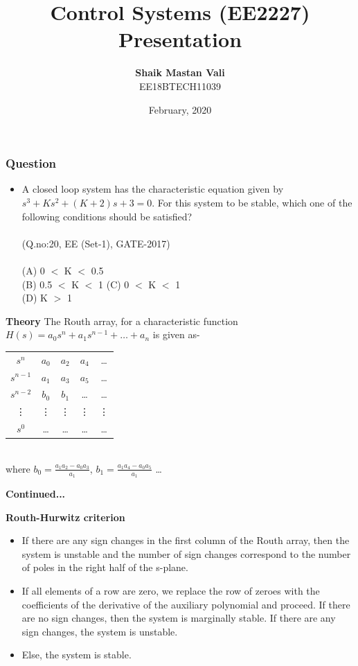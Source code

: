 \documentclass{beamer}
\title{\textbf{Control Systems (EE2227) Presentation}}
\author{\textbf{Shaik Mastan Vali}\\EE18BTECH11039}
\date{February, 2020}
\begin{document}
\maketitle
\begin{frame}
\frametitle{\textbf{Question}}
\begin{itemize}
\item A closed loop system has the characteristic equation given by \(s^3+Ks^2+(K+2)s+3 = 0\). For this system to be stable, which one of the following conditions should be satisfied? \\~\\(Q.no:20, EE (Set-1), GATE-2017)\\~\\
(A) 0 \(<\) K \(<\) 0.5 \\ (B) 0.5 \(<\) K \(<\) 1 \newline(C) 0 \(<\) K \(<\) 1  \\ (D) K \(>\) 1
\end{itemize}
\end{frame}

\begin{frame}{\textbf{Theory}}
The Routh array, for a characteristic function \(H(s) = a_0s^n+a_1s^{n-1}+\ldots+a_n\) is given as-
\begin{center}
\begin{tabular}{ c c c c c}
 \(s^n\) & \(a_0\) & \(a_2\) & \(a_4\) & \ldots \\
 \(s^{n-1}\) & \(a_1\) & \(a_3\) & \(a_5\) & \ldots \\ 
 \(s^{n-2}\) & \(b_0\) & \(b_1\) & \dots & \dots\\
 \vdots & \vdots & \vdots & \vdots & \vdots \\
 \(s^0\) & \dots & \dots & \dots & \dots
\end{tabular}
\end{center}
\\
where \(b_0 = \frac{a_1a_2-a_0a_3}{a_1}\), \(b_1 = \frac{a_1a_4-a_0a_5}{a_1}\) \dots
\end{frame}

\begin{frame}{\textbf{Continued...}}
\begin{center}
    \textbf{Routh-Hurwitz criterion}
\end{center}
\begin{itemize}
    \item If there are any sign changes in the first column of the Routh array, then the system is unstable and the number of sign changes correspond to the number of poles in the right half of the s-plane.
    \item If all elements of a row are zero, we replace the row of zeroes with the coefficients of the derivative of the auxiliary polynomial and proceed. If there are no sign changes, then the system is marginally stable. If there are any sign changes, the system is unstable.
    \item Else, the system is stable.
\end{itemize}
\end{frame}
\end{document}
